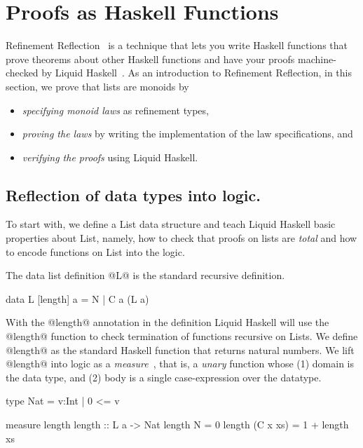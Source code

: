 \section{Proofs as Haskell Functions}\label{sec:haskell-proofs}

Refinement Reflection~\cite{reflection} is a technique
that lets you write Haskell functions that prove theorems
about other Haskell functions and have your proofs machine-checked
by Liquid Haskell~\cite{Vazou14}.
%
As an introduction to Refinement Reflection,
in this section, we prove that lists are monoids by
\begin{itemize}
\item \textit{specifying monoid laws} as refinement types,
\item \textit{proving the laws} by writing the implementation of the law specifications, and
\item \textit{verifying the proofs} using Liquid Haskell.
\end{itemize}

\subsection{Reflection of data types into logic.}
To start with,
we define a List data structure and
teach Liquid Haskell basic properties about List,
namely, how to check that proofs on lists are \textit{total}
and how to encode functions on List into the logic.

The data list definition @L@ is the standard recursive definition.
\begin{code}
data L [length] a = N | C a (L a)
\end{code}
%
With the @length@ annotation in the definition Liquid Haskell
will use the @length@ function to check termination
of functions recursive on Lists.
%
We define @length@ as the standard Haskell function
that returns natural numbers.
%
We lift @length@ into logic as a \textit{measure}~\cite{Vazou14},
that is, a \textit{unary} function whose (1) domain is the data type, and
(2) body is a single case-expression over the datatype.
\begin{code}
type Nat = {v:Int | 0 <= v}

measure length
length         :: L a -> Nat
length N        = 0
length (C x xs) = 1 + length xs
\end{code}

